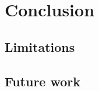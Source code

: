 


\chapter{Conclusion}
\label{chap:conclusion}
\pagestyle{plain}

\section{Limitations}

\section{Future work}